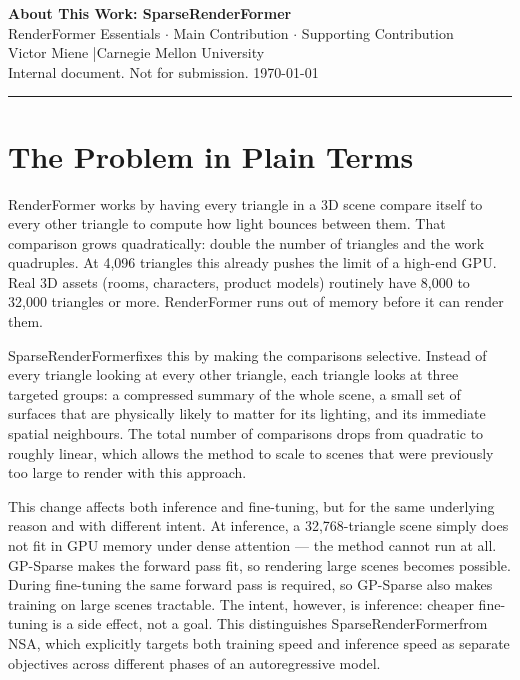 \documentclass[11pt,letterpaper]{article}
\newcommand{\ours}{SparseRenderFormer}
\begin{document}
\begin{center}
  {\LARGE\bfseries About This Work: \ours}\\[6pt]
  {\large RenderFormer Essentials $\cdot$ Main Contribution $\cdot$ Supporting Contribution}\\[4pt]
  {\normalsize Victor Miene \quad|\quad Carnegie Mellon University}\\[2pt]
  {\small\color{gray}Internal document. Not for submission. \today}
\end{center}

\hrule
\vspace{10pt}

\tableofcontents
\newpage

\section*{The Problem in Plain Terms}

RenderFormer works by having every triangle in a 3D scene compare itself
to every other triangle to compute how light bounces between them.
That comparison grows quadratically: double the number of triangles and
the work quadruples.
At 4{,}096 triangles this already pushes the limit of a high-end GPU.
Real 3D assets (rooms, characters, product models) routinely
have 8{,}000 to 32{,}000 triangles or more.
RenderFormer runs out of memory before it can render them.

\ours fixes this by making the comparisons selective.
Instead of every triangle looking at every other triangle, each triangle
looks at three targeted groups: a compressed summary of the whole scene,
a small set of surfaces that are physically likely to matter for its
lighting, and its immediate spatial neighbours.
The total number of comparisons drops from quadratic to roughly linear,
which allows the method to scale to scenes that were previously too large
to render with this approach.

This change affects both inference and fine-tuning, but for the same
underlying reason and with different intent.
At inference, a 32{,}768-triangle scene simply does not fit in GPU memory
under dense attention --- the method cannot run at all.
GP-Sparse makes the forward pass fit, so rendering large scenes becomes
possible.
During fine-tuning the same forward pass is required, so GP-Sparse also
makes training on large scenes tractable.
The intent, however, is inference: cheaper fine-tuning is a side effect,
not a goal.
This distinguishes \ours from NSA, which explicitly targets both training
speed and inference speed as separate objectives across different phases
of an autoregressive model.
\end{document}
